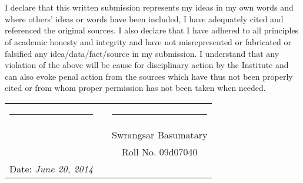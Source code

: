 \chapter*{}
\thispagestyle{empty}

I declare that this written submission represents my ideas in my own words
and where others' ideas or words have been included, I have adequately cited
and referenced the original sources. I also declare that I have adhered to all
principles of academic honesty and integrity and have not misrepresented or
fabricated or falsified any idea/data/fact/source in my submission. I
understand that any violation of the above will be cause for disciplinary
action by the Institute and can also evoke penal action from the sources which
have thus not been properly cited or from whom proper permission has not been
taken when needed.

\vspace{1.5cm}

\begin{tabular}{llc}
\rule{40mm}{0pt}        & \rule{50mm}{0pt}       & \rule{55mm}{0pt} \\
                        &                        & \large{Swrangsar Basumatary} \\
                        &                        & Roll No. 09d07040 \\
Date: \emph{June 20, 2014}           &                        & \\

\end{tabular}